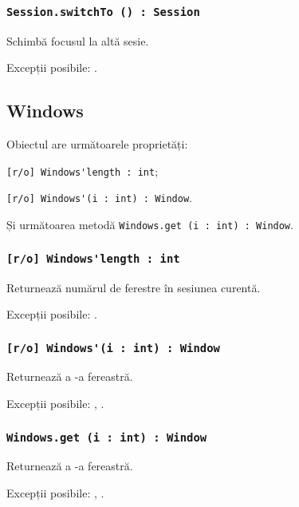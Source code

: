 \subsubsection{\lstinline|Session.switchTo () : Session|}

Schimbă focusul la altă sesie.

Excepții posibile: .


\subsection{{\color{orange} Windows}}

Obiectul \windows{} are următoarele proprietăți:
\begin{icItems}
	\item \lstinline|[r/o] Windows'length : int|;
	\item \lstinline|[r/o] Windows'(i : int) : Window|.
\end{icItems}

Și următoarea metodă \lstinline|Windows.get (i : int) : Window|.

\subsubsection{\lstinline|[r/o] Windows'length : int|}

Returnează numărul de ferestre în sesiunea curentă.

Excepții posibile: .

\subsubsection{\lstinline|[r/o] Windows'(i : int) : Window|}

Returnează a -a fereastră.

Excepții posibile: , .

\subsubsection{\lstinline|Windows.get (i : int) : Window|}

Returnează a -a fereastră.

Excepții posibile: , .

